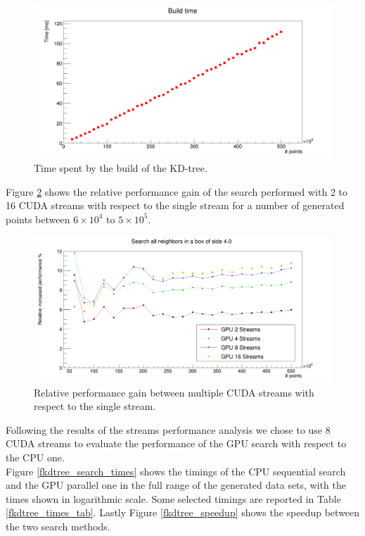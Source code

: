 \begin{figure}
\includegraphics[width=\textwidth]{fkdtree/fkdBuildTimes.png}
\caption{Time spent by the build of the KD-tree.}
\label{fkdtree_build_times}
\end{figure}

Figure \ref{fkdtree_streams} shows the relative performance gain of the search performed with 2 to 16 CUDA streams with respect to the single stream for a number of generated points between $6 \times 10^4$ to $5 \times 10^5$.
\begin{figure}
\includegraphics[width=\textwidth]{fkdtree/fkdStreams.png}
\caption{Relative performance gain between multiple CUDA streams with respect to the single stream.}
\label{fkdtree_streams}
\end{figure}

Following the results of the streams performance analysis we chose to use 8 CUDA streams to evaluate the performance of the GPU search with respect to the CPU one.\\
Figure \ref{fkdtree_search_times} shows the timings of the CPU sequential search and the GPU parallel one in the full range of the generated data sets, with the times shown in logarithmic scale.
Some selected timings are reported in Table \ref{fkdtree_times_tab}.
Lastly Figure \ref{fkdtree_speedup} shows the speedup between the two search methods.

